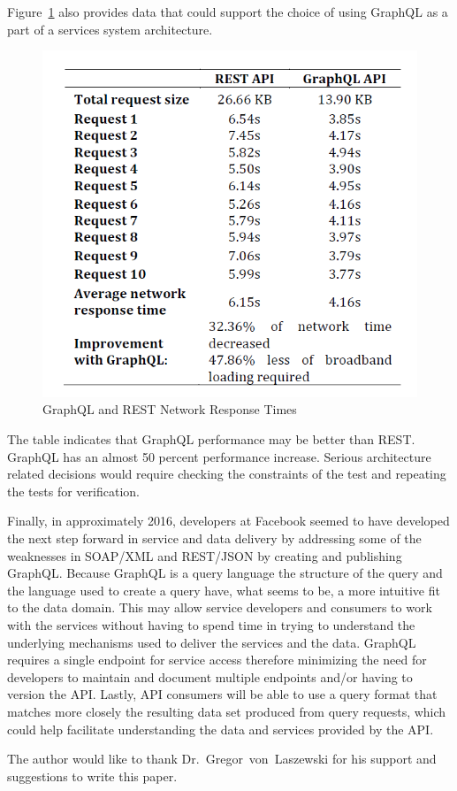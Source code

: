Figure~\ref{f:network-response}\cite{VzquezIngelmo2017ImprovingTO} also 
provides data that could support the choice of using GraphQL as a part of a 
services system architecture.  
\begin{figure}[!ht]
  \centering\includegraphics[width=\columnwidth]{images/network-response-times.png}
  \caption{GraphQL and REST Network Response Times}\label{f:network-response}
\end{figure}
The table indicates that GraphQL performance may be better than REST.  GraphQL 
has an almost 50 percent performance increase.  Serious architecture related 
decisions would require checking the constraints of the test and repeating the 
tests for verification.

Finally, in approximately 2016, developers at Facebook seemed to have 
developed the next step forward in service and data delivery by addressing some 
of the weaknesses in SOAP/XML and REST/JSON by creating and publishing GraphQL.
Because GraphQL is a query language the structure of the query and the language 
used to create a query have, what seems to be, a more intuitive fit to the data 
domain.  This may allow service developers and consumers to work with the 
services without having to spend time in trying to understand the underlying 
mechanisms used to deliver the services and the data.  GraphQL requires a 
single endpoint for service access therefore minimizing the need for developers 
to maintain and document multiple endpoints and/or having to version the API.  
Lastly, API consumers will be able to use a query format that matches more 
closely the resulting data set produced from query requests, which could help 
facilitate understanding the data and services provided by the API.

\begin{acks}

  The author would like to thank Dr.~Gregor~von~Laszewski for his
  support and suggestions to write this paper.

\end{acks}


 
